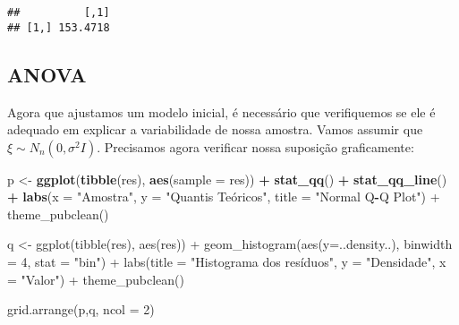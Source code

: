 \documentclass[
]{article}
\newenvironment{Shaded}{\begin{snugshade}}{\end{snugshade}}
\newcommand{\CommentTok}[1]{\textcolor[rgb]{0.56,0.35,0.01}{\textit{#1}}}
\newcommand{\DataTypeTok}[1]{\textcolor[rgb]{0.13,0.29,0.53}{#1}}
\newcommand{\KeywordTok}[1]{\textcolor[rgb]{0.13,0.29,0.53}{\textbf{#1}}}
\newcommand{\NormalTok}[1]{#1}
\newcommand{\OperatorTok}[1]{\textcolor[rgb]{0.81,0.36,0.00}{\textbf{#1}}}
\newcommand{\StringTok}[1]{\textcolor[rgb]{0.31,0.60,0.02}{#1}}
\begin{document}
\begin{verbatim}
##          [,1]
## [1,] 153.4718
\end{verbatim}

\hypertarget{anova}{%
\subsection{ANOVA}\label{anova}}

Agora que ajustamos um modelo inicial, é necessário que verifiquemos se
ele é adequado em explicar a variabilidade de nossa amostra. Vamos
assumir que \(\xi\sim N_n(0,\sigma^2I)\). Precisamos agora verificar
nossa suposição graficamente:

\begin{Shaded}
\end{Shaded}

\begin{Shaded}
\begin{Highlighting}[]
\NormalTok{p <-}\StringTok{ }\KeywordTok{ggplot}\NormalTok{(}\KeywordTok{tibble}\NormalTok{(res), }\KeywordTok{aes}\NormalTok{(}\DataTypeTok{sample =}\NormalTok{ res)) }\OperatorTok{+}\StringTok{ }\KeywordTok{stat_qq}\NormalTok{() }\OperatorTok{+}\StringTok{ }\KeywordTok{stat_qq_line}\NormalTok{() }\OperatorTok{+}
\StringTok{  }\KeywordTok{labs}\NormalTok{(}\DataTypeTok{x =} \StringTok{"Amostra"}\NormalTok{,}
       \DataTypeTok{y =} \StringTok{"Quantis Teóricos",}
\StringTok{       title = "}\NormalTok{Normal Q}\OperatorTok{-}\NormalTok{Q Plot}\StringTok{") +}
\StringTok{  theme_pubclean()}

\StringTok{q <- ggplot(tibble(res), aes(res)) +}
\StringTok{  geom_histogram(aes(y=..density..), binwidth = 4, stat = "}\NormalTok{bin}\StringTok{") +}
\StringTok{  labs(title = "}\NormalTok{Histograma dos resíduos}\StringTok{",}
\StringTok{       y = "}\NormalTok{Densidade}\StringTok{",}
\StringTok{       x = "}\NormalTok{Valor}\StringTok{") +}
\StringTok{  theme_pubclean()}

\StringTok{grid.arrange(p,q, ncol = 2)}
\end{Highlighting}
\end{Shaded}
\end{document}
